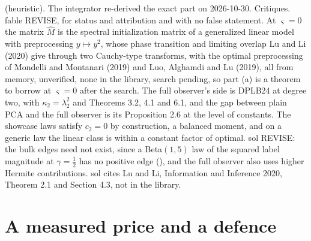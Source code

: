 \begin{conjecture}
{(heuristic). The integrator re-derived the exact part on 2026-10-30. Critiques. fable
REVISE, for status and attribution and with no false statement. At $\varsigma=0$ the
matrix $\hat M$ is the spectral initialization matrix of a generalized linear model
with preprocessing $y\mapsto y^2$, whose phase transition and limiting overlap Lu and
Li (2020) give through two Cauchy-type transforms, with the optimal preprocessing of
Mondelli and Montanari (2019) and Luo, Alghamdi and Lu (2019), all from memory,
unverified, none in the library, search pending, so part (a) is a theorem to borrow at
$\varsigma=0$ after the search. The full observer's side is DPLB24 at degree two, with
$\kappa_2=\lambda_2^2$ and Theorems 3.2, 4.1 and 6.1, and the gap between plain PCA and
the full observer is its Proposition 2.6 at the level of constants. The showcase laws
satisfy $c_2=0$ by construction, a balanced moment, and on a generic law the linear
class is within a constant factor of optimal. sol REVISE: the bulk edges need not
exist, since a Beta$(1,5)$ law of the squared label magnitude at $\gamma=\frac12$ has
no positive edge (), and the full observer also uses
higher Hermite contributions. sol cites Lu and Li, Information and Inference 2020,
Theorem 2.1 and Section 4.3, not in the library.}
\end{conjecture}

\section{A measured price and a defence}

